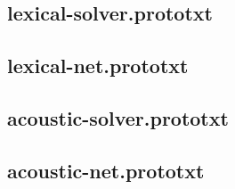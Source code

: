 \documentclass[a4paper,12pt,pagesize,headsepline,bibliography=totoc,titlepage]{scrartcl}
\begin{document}
\subsection{lexical-solver.prototxt}

\newpage

\subsection{lexical-net.prototxt}

\newpage

\subsection{acoustic-solver.prototxt}

\newpage

\subsection{acoustic-net.prototxt}


\end{document}
